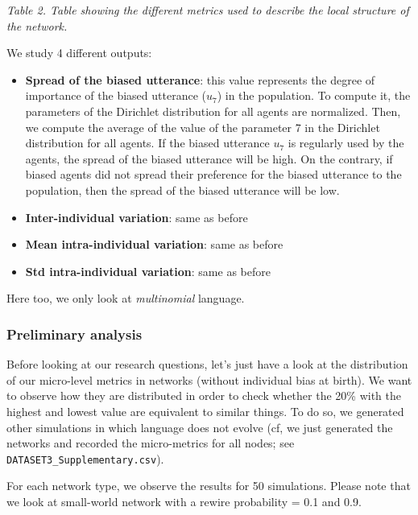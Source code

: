 \documentclass[
]{article}
\providecommand{\tightlist}{%
  \setlength{\itemsep}{0pt}\setlength{\parskip}{0pt}}
\begin{document}
\emph{Table 2. Table showing the different metrics used to describe the
local structure of the network.}

We study 4 different outputs:

\begin{itemize}
\tightlist
\item
  \textbf{Spread of the biased utterance}: this value represents the
  degree of importance of the biased utterance (\(u_7\)) in the
  population. To compute it, the parameters of the Dirichlet
  distribution for all agents are normalized. Then, we compute the
  average of the value of the parameter 7 in the Dirichlet distribution
  for all agents. If the biased utterance \(u_7\) is regularly used by
  the agents, the spread of the biased utterance will be high. On the
  contrary, if biased agents did not spread their preference for the
  biased utterance to the population, then the spread of the biased
  utterance will be low.
\item
  \textbf{Inter-individual variation}: same as before
\item
  \textbf{Mean intra-individual variation}: same as before
\item
  \textbf{Std intra-individual variation}: same as before
\end{itemize}

Here too, we only look at \emph{multinomial} language.

\hypertarget{preliminary-analysis}{%
\subsubsection{Preliminary analysis}\label{preliminary-analysis}}

Before looking at our research questions, let's just have a look at the
distribution of our micro-level metrics in networks (without individual
bias at birth). We want to observe how they are distributed in order to
check whether the 20\% with the highest and lowest value are equivalent
to similar things. To do so, we generated other simulations in which
language does not evolve (cf, we just generated the networks and
recorded the micro-metrics for all nodes; see
\texttt{DATASET3\_Supplementary.csv}).

For each network type, we observe the results for 50 simulations. Please
note that we look at small-world network with a rewire probability = 0.1
and 0.9.
\end{document}
